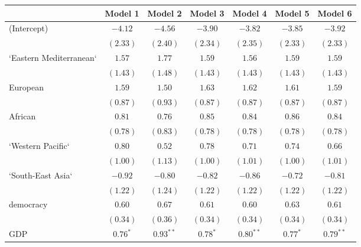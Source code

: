 
\begin{table}[!h]
\begin{center}
\begin{tabular}{l c c c c c c }
\toprule
 & Model 1 & Model 2 & Model 3 & Model 4 & Model 5 & Model 6 \\
\midrule
(Intercept)             & $-4.12$      & $-4.56$      & $-3.90$      & $-3.82$      & $-3.85$      & $-3.92$      \\
                        & $(2.33)$     & $(2.40)$     & $(2.34)$     & $(2.35)$     & $(2.33)$     & $(2.33)$     \\
`Eastern Mediterranean` & $1.57$       & $1.77$       & $1.59$       & $1.56$       & $1.59$       & $1.59$       \\
                        & $(1.43)$     & $(1.48)$     & $(1.43)$     & $(1.43)$     & $(1.43)$     & $(1.43)$     \\
European                & $1.59$       & $1.50$       & $1.63$       & $1.62$       & $1.61$       & $1.59$       \\
                        & $(0.87)$     & $(0.93)$     & $(0.87)$     & $(0.87)$     & $(0.87)$     & $(0.87)$     \\
African                 & $0.81$       & $0.76$       & $0.85$       & $0.84$       & $0.86$       & $0.84$       \\
                        & $(0.78)$     & $(0.83)$     & $(0.78)$     & $(0.78)$     & $(0.78)$     & $(0.78)$     \\
`Western Pacific`       & $0.80$       & $0.52$       & $0.78$       & $0.71$       & $0.74$       & $0.66$       \\
                        & $(1.00)$     & $(1.13)$     & $(1.00)$     & $(1.01)$     & $(1.00)$     & $(1.01)$     \\
`South-East Asia`       & $-0.92$      & $-0.80$      & $-0.82$      & $-0.86$      & $-0.72$      & $-0.81$      \\
                        & $(1.22)$     & $(1.24)$     & $(1.22)$     & $(1.22)$     & $(1.22)$     & $(1.22)$     \\
democracy               & $0.60$       & $0.67$       & $0.61$       & $0.60$       & $0.63$       & $0.61$       \\
                        & $(0.34)$     & $(0.36)$     & $(0.34)$     & $(0.34)$     & $(0.34)$     & $(0.34)$     \\
GDP                     & $0.76^{*}$   & $0.93^{**}$  & $0.78^{*}$   & $0.80^{**}$  & $0.77^{*}$   & $0.79^{**}$  \\

\end{tabular}
\end{center}
\end{table}
